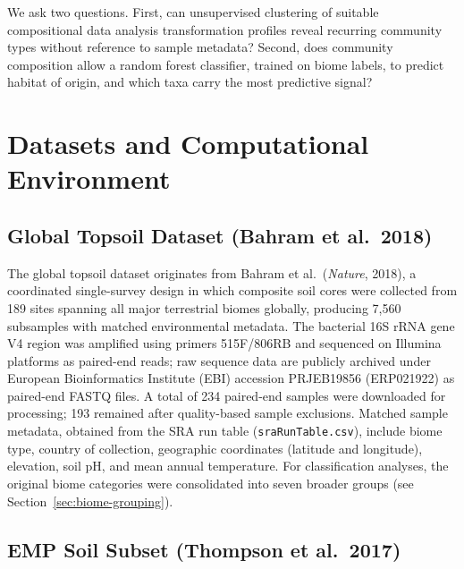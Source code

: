 \documentclass[12pt, oneside]{report}
\begin{document}
We ask two questions. First, can unsupervised clustering of suitable compositional data analysis transformation profiles reveal recurring community types without reference to sample
metadata? Second, does community composition allow a random forest classifier, trained on
biome labels, to predict habitat of origin, and which taxa carry the most predictive signal?

\chapter{Datasets and Computational Environment}

\section{Global Topsoil Dataset (Bahram et al.\ 2018)}

The global topsoil dataset originates from Bahram et al.\ (\textit{Nature}, 2018)\cite{bahram2018}, a
coordinated single-survey design in which composite soil cores were collected from 189 sites
spanning all major terrestrial biomes globally, producing 7,560 subsamples with matched
environmental metadata. The bacterial 16S rRNA gene V4 region was amplified using primers
515F/806RB and sequenced on Illumina platforms as paired-end reads; raw sequence data are
publicly archived under European Bioinformatics Institute (EBI) accession PRJEB19856 (ERP021922) as paired-end FASTQ files.
A total of 234 paired-end samples were downloaded for processing; 193 remained after
quality-based sample exclusions. Matched sample metadata, obtained from the SRA run table
(\texttt{sraRunTable.csv}), include biome type, country of collection, geographic coordinates
(latitude and longitude), elevation, soil pH, and mean annual temperature. For classification
analyses, the original biome categories were consolidated into seven broader groups (see
Section~\ref{sec:biome-grouping}). 

\section{EMP Soil Subset (Thompson et al.\ 2017)}
\end{document}
